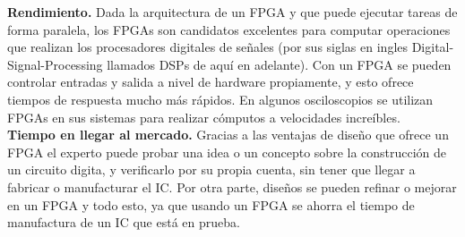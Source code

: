 \documentclass[twoside,spanish,ESP,MSc]{plantillaLabUPV}
\theoremstyle{definition}
\newcommand{\f}{FPGA }
\newcommand{\fs}{FPGAs }
\begin{document}
%

\checkmark\textbf{Rendimiento.} Dada la arquitectura de un \f y que puede ejecutar tareas de forma paralela, los \fs son candidatos excelentes para computar operaciones que realizan los procesadores digitales de señales (por sus siglas en ingles Digital-Signal-Processing llamados DSPs de aquí en adelante). Con un \f se pueden controlar entradas y salida a nivel de hardware propiamente, y esto ofrece tiempos de respuesta mucho más rápidos. En algunos osciloscopios se utilizan \fs en sus sistemas para realizar cómputos a velocidades increíbles.\\

\checkmark\textbf{Tiempo en llegar al mercado.} Gracias a las ventajas de diseño que ofrece un \f el experto puede probar una idea o un concepto sobre la construcción de un circuito digita, y verificarlo por su propia cuenta, sin tener que llegar a fabricar o manufacturar el IC. Por otra parte, diseños se pueden refinar o mejorar en un FPGA y todo esto, ya que usando un \f se ahorra el tiempo de manufactura de un IC que está en prueba.\\\\
\end{document}
